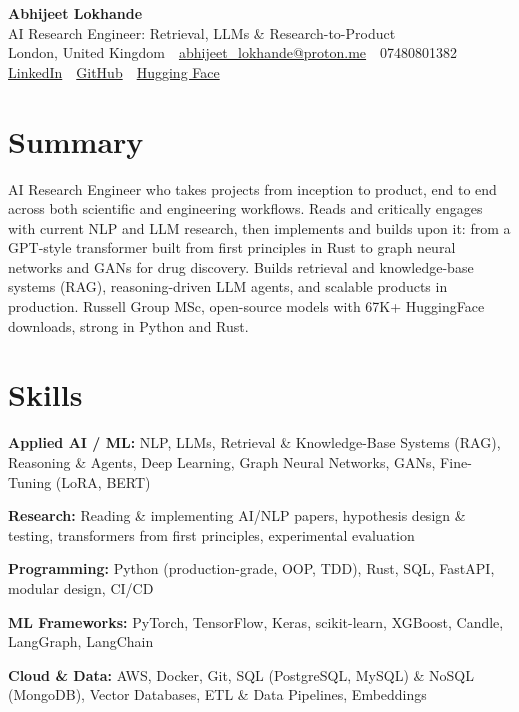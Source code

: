 \documentclass[10pt,a4paper]{article}
\newcommand{\sep}{\,\textcolor{accent!60}{\textbar}\,}
\begin{document}
\begin{center}
  {\fontsize{24}{26}\selectfont\bfseries Abhijeet Lokhande}\\[3pt]
  {\color{accent}\large AI Research Engineer: Retrieval, LLMs \& Research-to-Product}\\[5pt]
  {\small
    London, United Kingdom \sep
    \href{mailto:abhijeet_lokhande@proton.me}{abhijeet\_lokhande@proton.me} \sep
    07480801382 \\[2pt]
    \href{https://www.linkedin.com/in/ablds/}{LinkedIn} \sep
    \href{https://github.com/abhijeetscode}{GitHub} \sep
    \href{https://huggingface.co/ab-ai}{Hugging Face}
  }
\end{center}
\vspace{2pt}

\section{Summary}
AI Research Engineer who takes projects from inception to product, end to end across both scientific and engineering workflows. Reads and critically engages with current NLP and LLM research, then implements and builds upon it: from a GPT-style transformer built from first principles in Rust to graph neural networks and GANs for drug discovery. Builds retrieval and knowledge-base systems (RAG), reasoning-driven LLM agents, and scalable products in production. Russell Group MSc, open-source models with 67K+ HuggingFace downloads, strong in Python and Rust.

\section{Skills}
\begin{tight}
  \item[\textcolor{accent}{\small$\bullet$}] \textbf{Applied AI / ML:} NLP, LLMs, Retrieval \& Knowledge-Base Systems (RAG), Reasoning \& Agents, Deep Learning, Graph Neural Networks, GANs, Fine-Tuning (LoRA, BERT)
  \item[\textcolor{accent}{\small$\bullet$}] \textbf{Research:} Reading \& implementing AI/NLP papers, hypothesis design \& testing, transformers from first principles, experimental evaluation
  \item[\textcolor{accent}{\small$\bullet$}] \textbf{Programming:} Python (production-grade, OOP, TDD), Rust, SQL, FastAPI, modular design, CI/CD
  \item[\textcolor{accent}{\small$\bullet$}] \textbf{ML Frameworks:} PyTorch, TensorFlow, Keras, scikit-learn, XGBoost, Candle, LangGraph, LangChain
  \item[\textcolor{accent}{\small$\bullet$}] \textbf{Cloud \& Data:} AWS, Docker, Git, SQL (PostgreSQL, MySQL) \& NoSQL (MongoDB), Vector Databases, ETL \& Data Pipelines, Embeddings
\end{tight}
\end{document}
